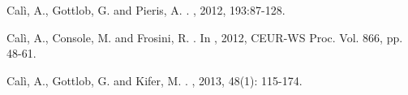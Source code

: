 \documentclass[format=acmsmall, review=false, screen=true]{acmart}
\newcommand{\ignore}[1]{}
\newcommand{\dl}{DL}
\begin{document}
\begin{thebibliography}{1}


\ignore{
\bibitem[Cal\`{i} et al.(2012a)]{cali12is}
Cal\`{i}, A., Gottlob, G. and Pieris, A.
\newblock{Ontological Query Answering under Expressive Entity-Relationship Schemata}.
\newblock{\em Information Systems}, 2012, 37(4): 320-335.}

\ignore{\bibitem[Cal\`{i} et al.(2012b)]{cali12jws} %
Cal\`{i}, A., Gottlob, G. and Lukasiewicz, T.
\newblock{A General Datalog-Based Framework for Tractable Query Answering over Ontologies}.
\newblock{\em J. of Web Semantics}, 2012, 14:57-83. }

Cal\`{i}, A., Gottlob, G. and Pieris, A.
.
, 2012, 193:87-128.

Cal\`{i}, A., Console, M. and Frosini, R.
.
In , 2012, CEUR-WS Proc. Vol. 866, pp. 48-61.

Cal\`{i}, A., Gottlob, G. and Kifer, M.
.
, 2013, 48(1): 115-174.



\end{thebibliography}
\end{document}
